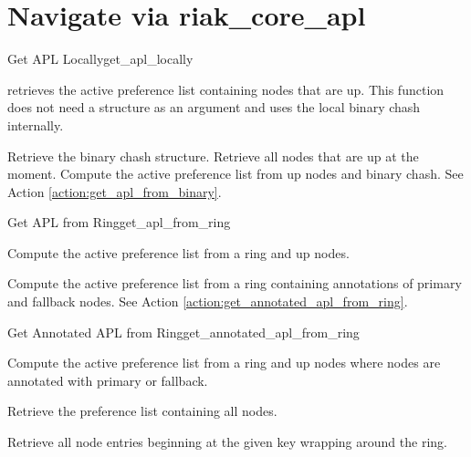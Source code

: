 \section{Navigate via riak\_core\_apl}

\begin{actionbox}{Get APL Locally}{get_apl_locally}
	\begin{action}
		 retrieves the active preference list containing nodes that are up.
		This function does not need a structure as an argument and uses the local binary chash internally.
		\begin{action}
			 Retrieve the binary chash structure.
			 Retrieve all nodes that are up at the moment.
			 Compute the active preference list from up nodes and binary chash.
			See Action \ref{action:get_apl_from_binary}.
		\end{action}
	\end{action}
\end{actionbox}

\begin{actionbox}{Get APL from Ring}{get_apl_from_ring}
	\begin{action}
		 Compute the active preference list from a ring and up nodes.
		\begin{action}
			 Compute the active preference list from a ring containing annotations of primary and fallback nodes.
			See Action \ref{action:get_annotated_apl_from_ring}.
		\end{action}
	\end{action}
\end{actionbox}

\begin{actionbox}{Get Annotated APL from Ring}{get_annotated_apl_from_ring}
	\begin{action}
		 Compute the active preference list from a ring and up nodes where nodes are annotated with primary or fallback.
		\begin{action}
			 Retrieve the preference list containing all nodes.
			\begin{action}
				 Retrieve all node entries beginning at the given key wrapping around the ring.
			\end{action}
		\end{action}
	\end{action}
\end{actionbox}

